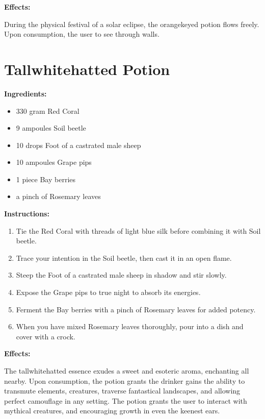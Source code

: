 \documentclass{article}
\begin{document}
\textbf{Effects:}

During the physical festival of a solar eclipse, the orangekeyed potion flows freely. Upon consumption, the user to see through walls.

\newpage
\section*{Tallwhitehatted Potion}

\textbf{Ingredients:}

\begin{itemize}
  \item 330 gram Red Coral
  \item 9 ampoules Soil beetle
  \item 10 drops Foot of a castrated male sheep
  \item 10 ampoules Grape pips
  \item 1 piece Bay berries
  \item a pinch of Rosemary leaves
\end{itemize}

\textbf{Instructions:}

\begin{enumerate}
  \item Tie the Red Coral with threads of light blue silk before combining it with Soil beetle.
  \item Trace your intention in the Soil beetle, then cast it in an open flame.
  \item Steep the Foot of a castrated male sheep in shadow and stir slowly.
  \item Expose the Grape pips to true night to absorb its energies.
  \item Ferment the Bay berries with a pinch of Rosemary leaves for added potency.
  \item When you have mixed Rosemary leaves thoroughly, pour into a dish and cover with a crock.
\end{enumerate}

\textbf{Effects:}

The tallwhitehatted essence exudes a sweet and esoteric aroma, enchanting all nearby. Upon consumption, the potion grants the drinker gains the ability to transmute elements, creatures, traverse fantastical landscapes, and allowing perfect camouflage in any setting. The potion grants the user to interact with mythical creatures, and encouraging growth in even the keenest ears.
\end{document}
